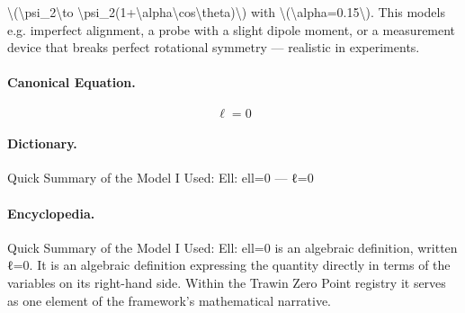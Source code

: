 \textbackslash{}(\textbackslash{}psi\_2\textbackslash{}to \textbackslash{}psi\_2(1+\textbackslash{}alpha\textbackslash{}cos\textbackslash{}theta)\textbackslash{}) with \textbackslash{}(\textbackslash{}alpha=0.15\textbackslash{}). This models e.g. imperfect alignment, a probe with a slight dipole moment, or a measurement device that breaks perfect rotational symmetry — realistic in experiments.

\paragraph{Canonical Equation.}
\[
\ell=0
\]

\paragraph{Dictionary.}
Quick Summary of the Model I Used: Ell: ell=0 — ℓ=0

\paragraph{Encyclopedia.}
Quick Summary of the Model I Used: Ell: ell=0 is an algebraic definition, written ℓ=0. It is an algebraic definition expressing the quantity directly in terms of the variables on its right-hand side. Within the Trawin Zero Point registry it serves as one element of the framework's mathematical narrative.

